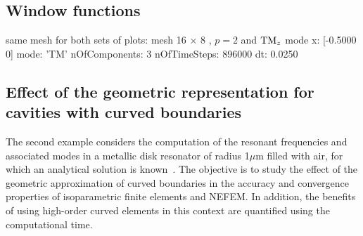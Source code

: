 \clearpage
\subsection{Window functions}
same mesh for both sets of plots:
mesh 16 $\times$ 8 , $p = 2$ and $\textrm{TM}_{z}$ mode
                x: [-0.5000 0]
             mode: 'TM'
    nOfComponents: 3
     nOfTimeSteps: 896000
               dt: 0.0250
\begin{figure}[!ht]
	\centering
{} 
\end{figure}
\begin{figure}[!ht]
	\centering
{}
\end{figure}
\begin{figure}[!ht]
	\centering
	\label{fig:rectangle2DfreeSpace_filteringConvergence}
\end{figure}
\clearpage
\subsection{Effect of the geometric representation for cavities with curved boundaries}
The second example considers the computation of the resonant frequencies and associated modes in a metallic disk resonator of radius 1$\mu$m filled with air, for which an analytical solution is known~\cite{BalanisBook}. The objective is to study the effect of the geometric approximation of curved boundaries in the accuracy and convergence properties of isoparametric finite elements and NEFEM. In addition, the benefits of using high-order curved elements in this context are quantified using the computational time. 

